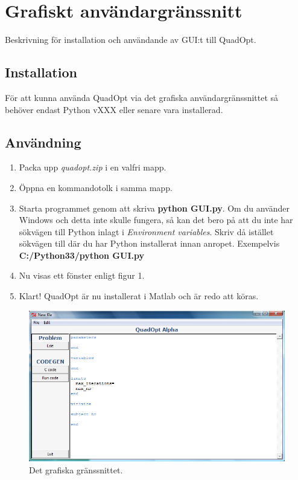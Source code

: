 \section{Grafiskt användargränssnitt}
Beskrivning för installation och användande av GUI:t till QuadOpt.

\subsection{Installation}
För att kunna använda QuadOpt via det grafiska användargränssnittet så behöver endast Python vXXX eller senare vara installerad.

\subsection{Användning}
\begin{enumerate}
	\item Packa upp \emph{quadopt.zip} i en valfri mapp.
	\item Öppna en kommandotolk i samma mapp.
	\item Starta programmet genom att skriva \textbf{python GUI.py}. Om du använder Windows och detta inte skulle fungera, så kan det bero på att du inte har sökvägen till Python inlagt i \emph{Environment variables}. Skriv då istället sökvägen till där du har Python installerat innan anropet. Exempelvis \textbf{C:/Python33/python GUI.py}
	\item Nu visas ett fönster enligt figur 1. 
	\item Klart! QuadOpt är nu installerat i Matlab och är redo att köras.
\end{enumerate}

\begin{figure}[h]
\includegraphics[scale=0.52]{bilder/gui.png}
\caption{Det grafiska gränssnittet.}
\end{figure}